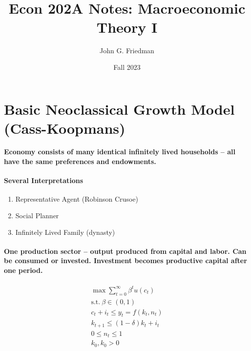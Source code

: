\documentclass{article}
\begin{document}
\title{Econ 202A Notes: Macroeconomic Theory I}
\author{John G. Friedman}
\date{Fall 2023}
\maketitle


\section{Basic Neoclassical Growth Model (Cass-Koopmans)}
\paragraph{Economy consists of many identical infinitely 
lived households -- all have the same preferences and endowments.}

\paragraph{Several Interpretations}
\begin{enumerate}
    \item Representative Agent (Robinson Crusoe)
    \item Social Planner
    \item Infinitely Lived Family (dynasty)
\end{enumerate}

\paragraph{One production sector -- output produced from capital and labor. 
Can be consumed or invested. Investment becomes productive capital 
after one period.}

\[
    \begin{aligned}
        \max_{} \sum_{t=0}^\infty \beta^t u(c_t)\\
        \text{s.t.}\ \beta \in (0,1)\\
        c_t + i_t \leq y_t = f(k_t, n_t)\\
        k_{t+1} \leq (1 - \delta) k_t + i_t\\
        0 \leq n_t \leq 1\\
        k_0, k_0 > 0
    \end{aligned}
\]
\end{document}
